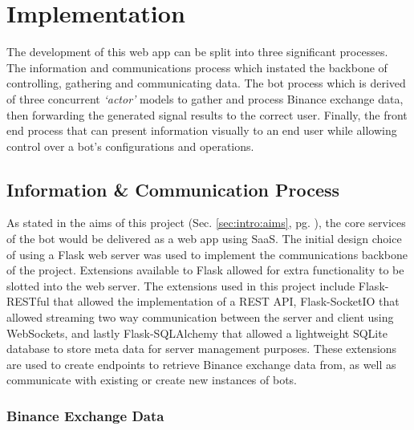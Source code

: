 %
\chapter{Implementation}
\label{sec:implementation}

The development of this web app can be split into three significant processes. The information and communications process which instated the backbone of controlling, gathering and communicating data. The bot process which is derived of three concurrent \textit{`actor'} models to gather and process Binance exchange data, then forwarding the generated signal results to the correct user. Finally, the front end process that can present information visually to an end user while allowing control over a bot's configurations and operations.

\section{Information \& Communication Process}
\label{sec:implementation:info_comm}

\noindent As stated in the aims of this project (Sec. \ref{sec:intro:aims}, pg. \pageref{sec:intro:aims}), the core services of the bot would be delivered as a web app using SaaS. The initial design choice of using a Flask web server was used to implement the communications backbone of the project. Extensions available to Flask allowed for extra functionality to be slotted into the web server. The extensions used in this project include Flask-RESTful that allowed the implementation of a REST API, Flask-SocketIO that allowed streaming two way communication between the server and client using WebSockets, and lastly Flask-SQLAlchemy that allowed a lightweight SQLite database to store meta data for server management purposes. These extensions are used to create endpoints to retrieve Binance exchange data from, as well as communicate with existing or create new instances of bots.

\subsection{Binance Exchange Data}
\label{sec:implementation:info_comm:binance_exchange_data}




